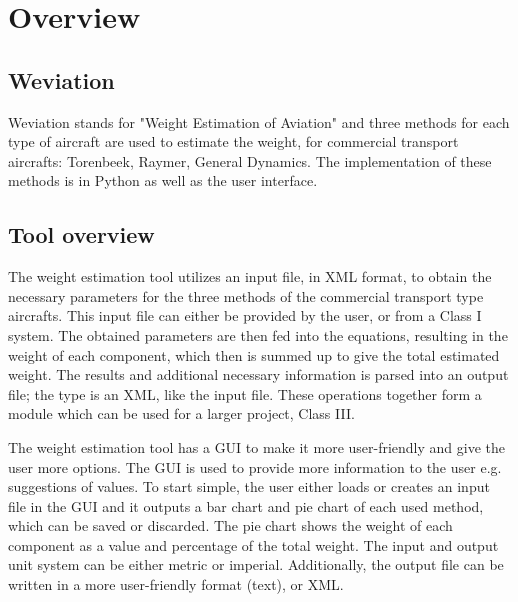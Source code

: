 \section{Overview}
\label{sec:overview}
\subsection{Weviation}
\label{subsec:weviation}
Weviation stands for "Weight Estimation of Aviation" and three methods for each type of aircraft are used to estimate the weight, for commercial transport aircrafts: Torenbeek, Raymer, General Dynamics. The implementation of these methods is in Python as well as the user interface.

\subsection{Tool overview}
\label{subsec:purpose}
The weight estimation tool utilizes an input file, in XML format, to obtain the necessary parameters for the three methods of the commercial transport type aircrafts.
This input file can either be provided by the user, or from a Class I system.
The obtained parameters are then fed into the equations, resulting in the weight of each component, which then is summed up to give the total estimated weight.
The results and additional necessary information is parsed into an output file; the type is an XML, like the input file.
These operations together form a module which can be used for a larger project, Class III.

The weight estimation tool has a GUI to make it more user-friendly and give the user more options. The GUI is used to provide more information to the user e.g. suggestions of values. To start simple, the user either loads or creates an input file in the GUI and it outputs a bar chart and pie chart of each used method, which can be saved or discarded. The pie chart shows the weight of each component as a value and percentage of the total weight. The input and output unit system can be either metric or imperial. Additionally, the output file can be written in a more user-friendly format (text), or XML.


